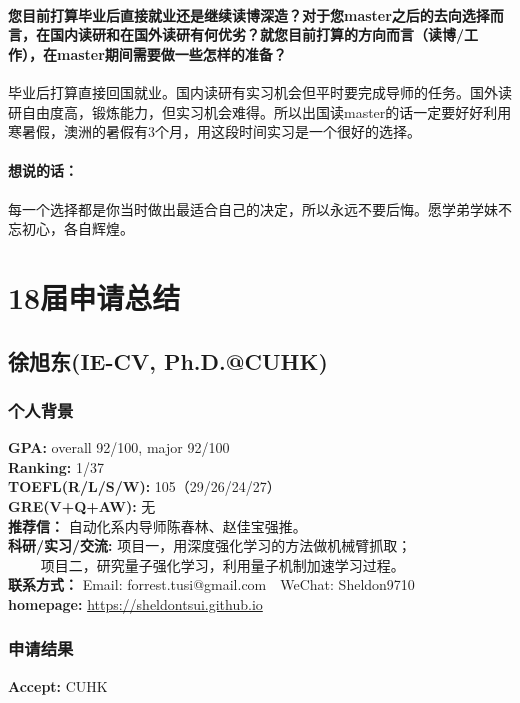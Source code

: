 \documentclass[a4paper,UTF8]{book}
\begin{document}
    \subsubsection*{您目前打算毕业后直接就业还是继续读博深造？对于您master之后的去向选择而言，在国内读研和在国外读研有何优劣？就您目前打算的方向而言（读博/工作），在master期间需要做一些怎样的准备？}
    毕业后打算直接回国就业。国内读研有实习机会但平时要完成导师的任务。国外读研自由度高，锻炼能力，但实习机会难得。所以出国读master的话一定要好好利用寒暑假，澳洲的暑假有3个月，用这段时间实习是一个很好的选择。

    \subsubsection{想说的话：}
    每一个选择都是你当时做出最适合自己的决定，所以永远不要后悔。愿学弟学妹不忘初心，各自辉煌。



\chapter{18届申请总结}
\thispagestyle{empty}
\clearpage
\section{徐旭东(IE-CV, Ph.D.@CUHK)}
    \subsection*{个人背景}
        \textbf{GPA:} overall 92/100, major 92/100 \\
        \textbf{Ranking:} 1/37\\
        \textbf{TOEFL(R/L/S/W):} 105（29/26/24/27）\\
        \textbf{GRE(V+Q+AW):} 无\\
        \textbf{推荐信：} 自动化系内导师陈春林、赵佳宝强推。\\
        \textbf{科研/实习/交流:} 项目一，用深度强化学习的方法做机械臂抓取；\\ $\qquad$ 项目二，研究量子强化学习，利用量子机制加速学习过程。\\ 
        \textbf{联系方式：} Email: forrest.tusi@gmail.com$\quad$WeChat: Sheldon9710   \\
        \textbf{homepage: } \url{https://sheldontsui.github.io}

    \subsection*{申请结果}
        \textbf{Accept:} CUHK
\end{document}
